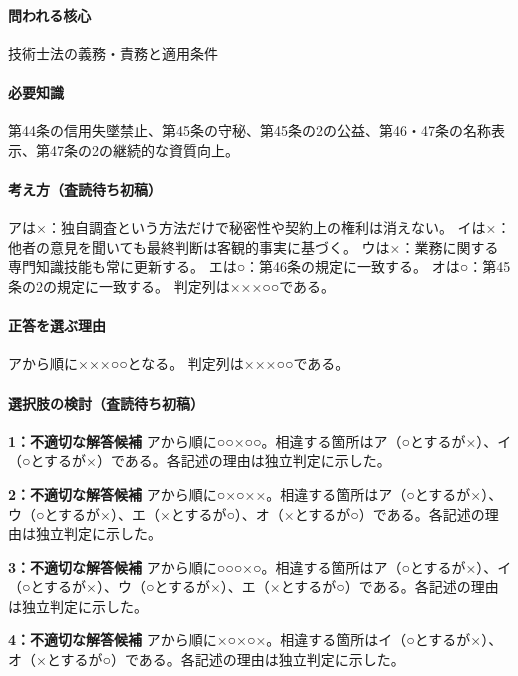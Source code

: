 \paragraph{問われる核心} 技術士法の義務・責務と適用条件

\paragraph{必要知識} 第44条の信用失墜禁止、第45条の守秘、第45条の2の公益、第46・47条の名称表示、第47条の2の継続的な資質向上。

\paragraph{考え方（査読待ち初稿）} アは×：独自調査という方法だけで秘密性や契約上の権利は消えない。 イは×：他者の意見を聞いても最終判断は客観的事実に基づく。 ウは×：業務に関する専門知識技能も常に更新する。 エは○：第46条の規定に一致する。 オは○：第45条の2の規定に一致する。 判定列は×××○○である。

\paragraph{正答を選ぶ理由} アから順に×××○○となる。  判定列は×××○○である。

\paragraph{選択肢の検討（査読待ち初稿）}\mbox{}\par

\noindent\textbf{1：不適切な解答候補} アから順に○○×○○。相違する箇所はア（○とするが×）、イ（○とするが×）である。各記述の理由は独立判定に示した。\par

\noindent\textbf{2：不適切な解答候補} アから順に○×○××。相違する箇所はア（○とするが×）、ウ（○とするが×）、エ（×とするが○）、オ（×とするが○）である。各記述の理由は独立判定に示した。\par

\noindent\textbf{3：不適切な解答候補} アから順に○○○×○。相違する箇所はア（○とするが×）、イ（○とするが×）、ウ（○とするが×）、エ（×とするが○）である。各記述の理由は独立判定に示した。\par

\noindent\textbf{4：不適切な解答候補} アから順に×○×○×。相違する箇所はイ（○とするが×）、オ（×とするが○）である。各記述の理由は独立判定に示した。\par

